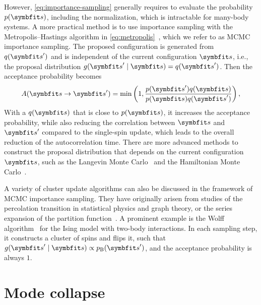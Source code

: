 However, \cref{eq:importance-sampling} generally requires to evaluate the probability $p(\vs)$, including the normalization, which is intractable for many-body systems. A more practical method is to use importance sampling with the Metropolis--Hastings algorithm in \cref{eq:metropolis}~\cite{liesenfeld2008improving, schuster2020markov}, which we refer to as MCMC importance sampling. The proposed configuration is generated from $q(\vs')$ and is independent of the current configuration $\vs$, i.e., the proposal distribution $g(\vs' \mid \vs) = q(\vs')$. Then the acceptance probability becomes
\begin{equation}
A(\vs \to \vs') = \min\left( 1, \frac{p(\vs') q(\vs)}{p(\vs) q(\vs')} \right),
\label{eq:mcmc-importance}
\end{equation}
With a $q(\vs)$ that is close to $p(\vs)$, it increases the acceptance probability, while also reducing the correlation between $\vs$ and $\vs'$ compared to the single-spin update, which leads to the overall reduction of the autocorrelation time. There are more advanced methods to construct the proposal distribution that depends on the current configuration $\vs$, such as the Langevin Monte Carlo~\cite{rossky1978brownian} and the Hamiltonian Monte Carlo~\cite{duane1987hybrid}.

A variety of cluster update algorithms can also be discussed in the framework of MCMC importance sampling. They have originally arisen from studies of the percolation transition in statistical physics and graph theory, or the series expansion of the partition function~\cite{fortuin1972random, leung1991percolation, evertz1993cluster}. A prominent example is the Wolff algorithm~\cite{wolff1989collective} for the Ising model with two-body interactions. In each sampling step, it constructs a cluster of spins and flips it, such that $g(\vs' \mid \vs) \propto p_\text{B}(\vs')$, and the acceptance probability is always $1$.


\section{Mode collapse}
\label{sec:mode-collapse}

